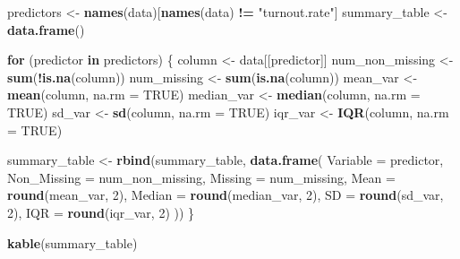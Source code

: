 \documentclass[
]{article}
\newenvironment{Shaded}{\begin{snugshade}}{\end{snugshade}}
\newcommand{\AttributeTok}[1]{\textcolor[rgb]{0.13,0.29,0.53}{#1}}
\newcommand{\ConstantTok}[1]{\textcolor[rgb]{0.56,0.35,0.01}{#1}}
\newcommand{\ControlFlowTok}[1]{\textcolor[rgb]{0.13,0.29,0.53}{\textbf{#1}}}
\newcommand{\DecValTok}[1]{\textcolor[rgb]{0.00,0.00,0.81}{#1}}
\newcommand{\FunctionTok}[1]{\textcolor[rgb]{0.13,0.29,0.53}{\textbf{#1}}}
\newcommand{\NormalTok}[1]{#1}
\newcommand{\OtherTok}[1]{\textcolor[rgb]{0.56,0.35,0.01}{#1}}
\newcommand{\SpecialCharTok}[1]{\textcolor[rgb]{0.81,0.36,0.00}{\textbf{#1}}}
\newcommand{\StringTok}[1]{\textcolor[rgb]{0.31,0.60,0.02}{#1}}
\begin{document}
\begin{Shaded}
\begin{Highlighting}[]
\NormalTok{predictors }\OtherTok{\textless{}{-}} \FunctionTok{names}\NormalTok{(data)[}\FunctionTok{names}\NormalTok{(data) }\SpecialCharTok{!=} \StringTok{"turnout.rate"}\NormalTok{]}
\NormalTok{summary\_table }\OtherTok{\textless{}{-}} \FunctionTok{data.frame}\NormalTok{()}

\ControlFlowTok{for}\NormalTok{ (predictor }\ControlFlowTok{in}\NormalTok{ predictors) \{}
\NormalTok{  column }\OtherTok{\textless{}{-}}\NormalTok{ data[[predictor]]}
\NormalTok{  num\_non\_missing }\OtherTok{\textless{}{-}} \FunctionTok{sum}\NormalTok{(}\SpecialCharTok{!}\FunctionTok{is.na}\NormalTok{(column))}
\NormalTok{  num\_missing }\OtherTok{\textless{}{-}} \FunctionTok{sum}\NormalTok{(}\FunctionTok{is.na}\NormalTok{(column))}
\NormalTok{  mean\_var }\OtherTok{\textless{}{-}} \FunctionTok{mean}\NormalTok{(column, }\AttributeTok{na.rm =} \ConstantTok{TRUE}\NormalTok{)}
\NormalTok{  median\_var }\OtherTok{\textless{}{-}} \FunctionTok{median}\NormalTok{(column, }\AttributeTok{na.rm =} \ConstantTok{TRUE}\NormalTok{)}
\NormalTok{  sd\_var }\OtherTok{\textless{}{-}} \FunctionTok{sd}\NormalTok{(column, }\AttributeTok{na.rm =} \ConstantTok{TRUE}\NormalTok{)}
\NormalTok{  iqr\_var }\OtherTok{\textless{}{-}} \FunctionTok{IQR}\NormalTok{(column, }\AttributeTok{na.rm =} \ConstantTok{TRUE}\NormalTok{)}

\NormalTok{  summary\_table }\OtherTok{\textless{}{-}} \FunctionTok{rbind}\NormalTok{(summary\_table, }\FunctionTok{data.frame}\NormalTok{(}
    \AttributeTok{Variable =}\NormalTok{ predictor,}
    \AttributeTok{Non\_Missing =}\NormalTok{ num\_non\_missing,}
    \AttributeTok{Missing =}\NormalTok{ num\_missing,}
    \AttributeTok{Mean =} \FunctionTok{round}\NormalTok{(mean\_var, }\DecValTok{2}\NormalTok{),}
    \AttributeTok{Median =} \FunctionTok{round}\NormalTok{(median\_var, }\DecValTok{2}\NormalTok{),}
    \AttributeTok{SD =} \FunctionTok{round}\NormalTok{(sd\_var, }\DecValTok{2}\NormalTok{),}
    \AttributeTok{IQR =} \FunctionTok{round}\NormalTok{(iqr\_var, }\DecValTok{2}\NormalTok{)}
\NormalTok{  ))}
\NormalTok{\}}

\FunctionTok{kable}\NormalTok{(summary\_table)}
\end{Highlighting}
\end{Shaded}
\end{document}

